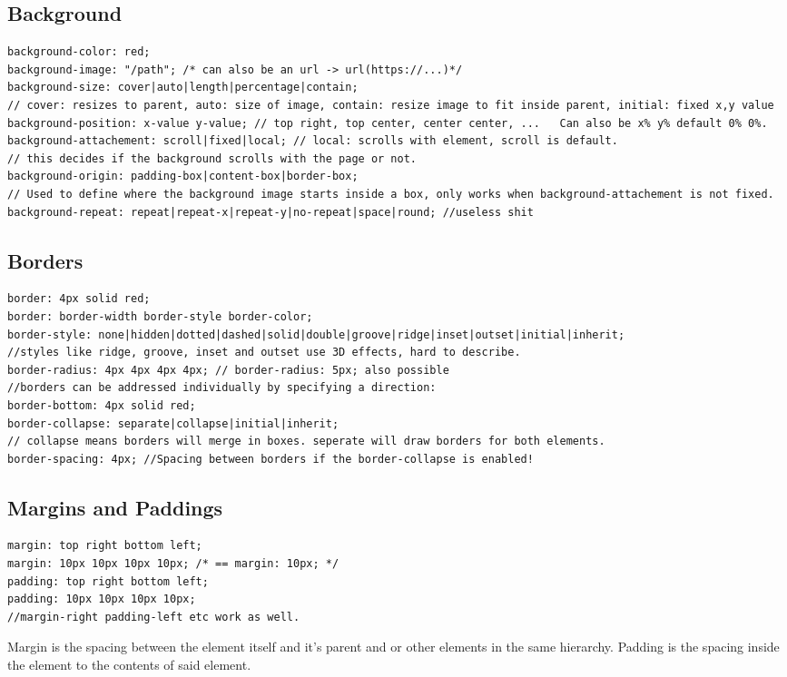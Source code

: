 \documentclass[main.tex,fontsize=6pt,paper=a4,paper=landscape,DIV=calc,]{scrartcl}
\begin{document}
\begin{multicols*}{4}
\subsection{Background}
\vspace{-2mm}
\begin{lstlisting}
background-color: red;
background-image: "/path"; /* can also be an url -> url(https://...)*/
background-size: cover|auto|length|percentage|contain;
// cover: resizes to parent, auto: size of image, contain: resize image to fit inside parent, initial: fixed x,y value
background-position: x-value y-value; // top right, top center, center center, ...   Can also be x% y% default 0% 0%.
background-attachement: scroll|fixed|local; // local: scrolls with element, scroll is default.
// this decides if the background scrolls with the page or not.
background-origin: padding-box|content-box|border-box; 
// Used to define where the background image starts inside a box, only works when background-attachement is not fixed.
background-repeat: repeat|repeat-x|repeat-y|no-repeat|space|round; //useless shit
\end{lstlisting}
\vspace{2mm}

\subsection{Borders}
\vspace{-2mm}
\begin{lstlisting}
border: 4px solid red;
border: border-width border-style border-color;
border-style: none|hidden|dotted|dashed|solid|double|groove|ridge|inset|outset|initial|inherit;
//styles like ridge, groove, inset and outset use 3D effects, hard to describe.
border-radius: 4px 4px 4px 4px; // border-radius: 5px; also possible
//borders can be addressed individually by specifying a direction:
border-bottom: 4px solid red;
border-collapse: separate|collapse|initial|inherit;
// collapse means borders will merge in boxes. seperate will draw borders for both elements.
border-spacing: 4px; //Spacing between borders if the border-collapse is enabled!
\end{lstlisting}
\vspace{2mm}


\subsection{Margins and Paddings}
\vspace{-2mm}
\begin{lstlisting}
margin: top right bottom left;
margin: 10px 10px 10px 10px; /* == margin: 10px; */
padding: top right bottom left;
padding: 10px 10px 10px 10px;
//margin-right padding-left etc work as well.
\end{lstlisting}
\vspace{2mm}
Margin is the spacing between the element itself and it's parent and or other elements in the same hierarchy.\newline
Padding is the spacing inside the element to the contents of said element.


\end{multicols*}
\end{document}
